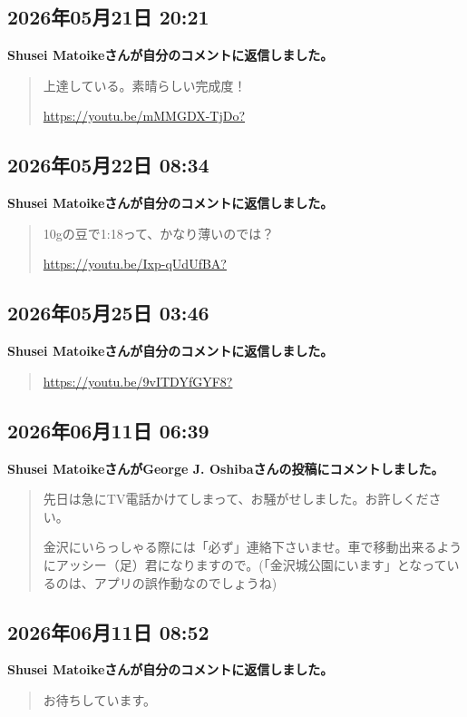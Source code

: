 \subsection*{2026年05月21日 20:21}

\textbf{Shusei Matoikeさんが自分のコメントに返信しました。}

\begin{quote}
上達している。素晴らしい完成度！

\url{https://youtu.be/mMMGDX-TjDo?}
\end{quote}

\subsection*{2026年05月22日 08:34}

\textbf{Shusei Matoikeさんが自分のコメントに返信しました。}

\begin{quote}
10gの豆で1:18って、かなり薄いのでは？

\url{https://youtu.be/Ixp-qUdUfBA?}
\end{quote}

\subsection*{2026年05月25日 03:46}

\textbf{Shusei Matoikeさんが自分のコメントに返信しました。}

\begin{quote}
\url{https://youtu.be/9vITDYfGYF8?}
\end{quote}

\subsection*{2026年06月11日 06:39}

\textbf{Shusei MatoikeさんがGeorge J. Oshibaさんの投稿にコメントしました。}

\begin{quote}
先日は急にTV電話かけてしまって、お騒がせしました。お許しください。

金沢にいらっしゃる際には「必ず」連絡下さいませ。車で移動出来るようにアッシー（足）君になりますので。(「金沢城公園にいます」となっているのは、アプリの誤作動なのでしょうね)
\end{quote}

\subsection*{2026年06月11日 08:52}

\textbf{Shusei Matoikeさんが自分のコメントに返信しました。}

\begin{quote}
お待ちしています。
\end{quote}

